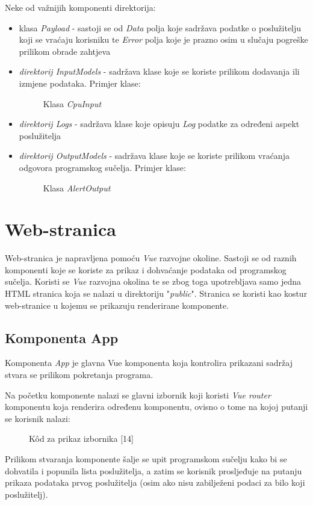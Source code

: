 \documentclass[zavrsnirad]{fer}
\begin{document}
Neke od važnijih komponenti direktorija:
\begin{itemize}
	\item klasa \textit{Payload} - sastoji se od \textit{Data} polja koje sadržava podatke o poslužitelju koji se vraćaju korisniku te \textit{Error} polja koje je prazno osim u slučaju pogreške prilikom obrade zahtjeva
	\item \textit{direktorij InputModels}  - sadržava klase koje se koriste prilikom dodavanja ili izmjene podataka. Primjer klase:
	\begin{figure}[htb]
		\centering
		
		\caption{Klasa \textit{CpuInput}}
	\end{figure}
	\FloatBarrier
	\item \textit{direktorij Logs} - sadržava klase koje opisuju \textit{Log} podatke za određeni aspekt poslužitelja
	\item \textit{direktorij OutputModels} - sadržava klase koje se koriste prilikom vraćanja odgovora programskog sučelja. Primjer klase:
	\begin{figure}[htb]
		\centering
		
		\caption{Klasa \textit{AlertOutput}}
	\end{figure}
	\FloatBarrier
\end{itemize}

\chapter{Web-stranica}
Web-stranica je napravljena pomoću \textit{Vue} razvojne okoline. Sastoji se od raznih komponenti koje se koriste za prikaz i dohvaćanje podataka od programskog sučelja.
Koristi se \textit{Vue} razvojna okolina te se zbog toga upotrebljava samo jedna HTML stranica koja se nalazi u direktoriju "\textit{public}". Stranica se koristi kao kostur web-stranice u kojemu se prikazuju renderirane komponente.

\section{Komponenta App}
Komponenta \textit{App} je glavna Vue komponenta koja kontrolira prikazani sadržaj stvara se prilikom pokretanja programa.

Na početku komponente nalazi se glavni izbornik koji koristi \textit{Vue router} komponentu koja renderira određenu komponentu, ovisno o tome na kojoj putanji se korisnik nalazi:
\begin{figure}[htb]
	\centering
	
	\caption{Kôd za prikaz izbornika [14]}
\end{figure}
\FloatBarrier
Prilikom stvaranja komponente šalje se upit programskom sučelju kako bi se dohvatila i popunila lista poslužitelja, a zatim se korisnik prosljeđuje na putanju prikaza podataka prvog poslužitelja (osim ako nisu zabilježeni podaci za bilo koji poslužitelj).
\end{document}
